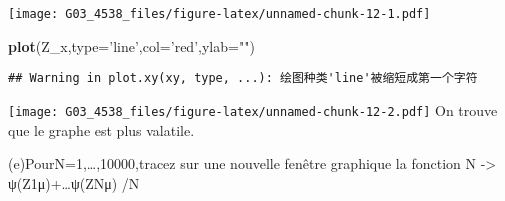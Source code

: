 \documentclass[]{article}
\newenvironment{Shaded}{\begin{snugshade}}{\end{snugshade}}
\newcommand{\KeywordTok}[1]{\textcolor[rgb]{0.13,0.29,0.53}{\textbf{#1}}}
\newcommand{\DataTypeTok}[1]{\textcolor[rgb]{0.13,0.29,0.53}{#1}}
\newcommand{\StringTok}[1]{\textcolor[rgb]{0.31,0.60,0.02}{#1}}
\newcommand{\NormalTok}[1]{#1}
\begin{document}
\texttt{[image: G03\_4538\_files/figure-latex/unnamed-chunk-12-1.pdf]}

\begin{Shaded}
\begin{Highlighting}[]
\KeywordTok{plot}\NormalTok{(Z_x,}\DataTypeTok{type=}\StringTok{'line'}\NormalTok{,}\DataTypeTok{col=}\StringTok{'red'}\NormalTok{,}\DataTypeTok{ylab=}\StringTok{""}\NormalTok{)}
\end{Highlighting}
\end{Shaded}

\begin{verbatim}
## Warning in plot.xy(xy, type, ...): 绘图种类'line'被缩短成第一个字符
\end{verbatim}

\texttt{[image: G03\_4538\_files/figure-latex/unnamed-chunk-12-2.pdf]} On
trouve que le graphe est plus valatile.

(e)PourN=1,\ldots{},10000,tracez sur une nouvelle fenêtre graphique la
fonction N -\textgreater{} ψ(Z1μ)+\ldots{}ψ(ZNμ) /N
\end{document}
